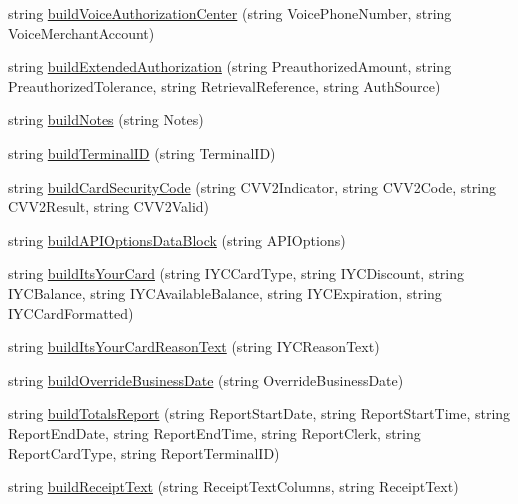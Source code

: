 \begin{DoxyCompactItemize}
\item 
string \mbox{\hyperlink{class_form_sim_1_1_t_c_p_handler_a40eab47f3a9bffb4d3e4c35c060fabb9}{build\+Voice\+Authorization\+Center}} (string Voice\+Phone\+Number, string Voice\+Merchant\+Account)
\item 
string \mbox{\hyperlink{class_form_sim_1_1_t_c_p_handler_a06f7834b69ef0ec41b08ed992a6610a3}{build\+Extended\+Authorization}} (string Preauthorized\+Amount, string Preauthorized\+Tolerance, string Retrieval\+Reference, string Auth\+Source)
\item 
string \mbox{\hyperlink{class_form_sim_1_1_t_c_p_handler_acdb4cc9ece3eb8587fd41943cfbc7e71}{build\+Notes}} (string Notes)
\item 
string \mbox{\hyperlink{class_form_sim_1_1_t_c_p_handler_a19f3ec26051c3752e6fcd6813f7b3367}{build\+Terminal\+ID}} (string Terminal\+ID)
\item 
string \mbox{\hyperlink{class_form_sim_1_1_t_c_p_handler_afa361081bcfa04e9ba1e8cf2df615243}{build\+Card\+Security\+Code}} (string C\+V\+V2\+Indicator, string C\+V\+V2\+Code, string C\+V\+V2\+Result, string C\+V\+V2\+Valid)
\item 
string \mbox{\hyperlink{class_form_sim_1_1_t_c_p_handler_a3cd058e3a758ebd5231bd8f7f4bf4baa}{build\+A\+P\+I\+Options\+Data\+Block}} (string A\+P\+I\+Options)
\item 
string \mbox{\hyperlink{class_form_sim_1_1_t_c_p_handler_aaf84b1a98216bbe1e593574e31282e96}{build\+Its\+Your\+Card}} (string I\+Y\+C\+Card\+Type, string I\+Y\+C\+Discount, string I\+Y\+C\+Balance, string I\+Y\+C\+Available\+Balance, string I\+Y\+C\+Expiration, string I\+Y\+C\+Card\+Formatted)
\item 
string \mbox{\hyperlink{class_form_sim_1_1_t_c_p_handler_a64e2943ce2776de1fd819880fbf4a51e}{build\+Its\+Your\+Card\+Reason\+Text}} (string I\+Y\+C\+Reason\+Text)
\item 
string \mbox{\hyperlink{class_form_sim_1_1_t_c_p_handler_af5a1aa32467dd09d17c1a6a4c1d0b91a}{build\+Override\+Business\+Date}} (string Override\+Business\+Date)
\item 
string \mbox{\hyperlink{class_form_sim_1_1_t_c_p_handler_ad919a832ffdf9c14ba929af56eee5a59}{build\+Totals\+Report}} (string Report\+Start\+Date, string Report\+Start\+Time, string Report\+End\+Date, string Report\+End\+Time, string Report\+Clerk, string Report\+Card\+Type, string Report\+Terminal\+ID)
\item 
string \mbox{\hyperlink{class_form_sim_1_1_t_c_p_handler_a2815486693e9cd0075980b209cf9843c}{build\+Receipt\+Text}} (string Receipt\+Text\+Columns, string Receipt\+Text)

\end{DoxyCompactItemize}
